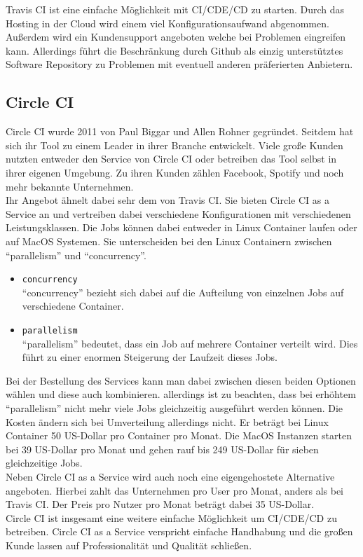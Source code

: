 Travis CI ist eine einfache Möglichkeit mit \ac{CI}/\ac{CDE}/\ac{CD} zu starten. Durch das Hosting in der Cloud wird einem viel Konfigurationsaufwand abgenommen. Außerdem wird ein Kundensupport angeboten welche bei Problemen eingreifen kann. Allerdings führt die Beschränkung durch Github als einzig unterstütztes Software Repository zu Problemen mit eventuell anderen präferierten Anbietern.
\subsection{Circle CI}
Circle CI wurde 2011 von Paul Biggar und Allen Rohner gegründet. Seitdem hat sich ihr Tool zu einem Leader in ihrer Branche entwickelt. Viele große Kunden nutzten entweder den Service von Circle CI oder betreiben das Tool selbst in ihrer eigenen Umgebung. Zu ihren Kunden zählen Facebook, Spotify und noch mehr bekannte Unternehmen. \\
Ihr Angebot ähnelt dabei sehr dem von Travis CI. Sie bieten Circle CI as a Service an und vertreiben dabei verschiedene Konfigurationen mit verschiedenen Leistungsklassen. Die Jobs können dabei entweder in Linux Container laufen oder auf MacOS Systemen. Sie unterscheiden bei den Linux Containern zwischen \enquote{parallelism} und \enquote{concurrency}.
\begin{itemize}
	\item \texttt{concurrency}\\
	\enquote{concurrency} bezieht sich dabei auf die Aufteilung von einzelnen Jobs auf verschiedene Container.
	\item \texttt{parallelism}\\
	\enquote{parallelism} bedeutet, dass ein Job auf mehrere Container verteilt wird. Dies führt zu einer enormen Steigerung der Laufzeit dieses Jobs.
\end{itemize}
Bei der Bestellung des Services kann man dabei zwischen diesen beiden Optionen wählen und diese auch kombinieren. allerdings ist zu beachten, dass bei erhöhtem \enquote{parallelism} nicht mehr viele Jobs gleichzeitig ausgeführt werden können. Die Kosten ändern sich bei Umverteilung allerdings nicht. Er beträgt bei Linux Container 50 US-Dollar pro Container pro Monat. Die MacOS Instanzen starten bei 39 US-Dollar pro Monat und gehen rauf bis 249 US-Dollar für sieben gleichzeitige Jobs.\\
Neben Circle CI as a Service wird auch noch eine eigengehostete Alternative angeboten. Hierbei zahlt das Unternehmen pro User pro Monat, anders als bei Travis CI. Der Preis pro Nutzer pro Monat beträgt dabei 35 US-Dollar.\\
Circle CI ist insgesamt eine weitere einfache Möglichkeit um \ac{CI}/\ac{CDE}/\ac{CD} zu betreiben. Circle CI as a Service verspricht einfache Handhabung und die großen Kunde lassen auf Professionalität und Qualität schließen.
